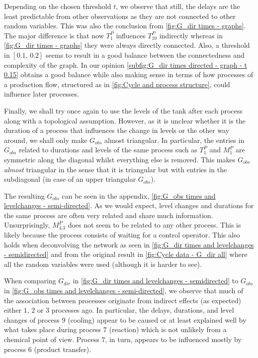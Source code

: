 \documentclass[../Thesis.tex]{subfiles}
\begin{document}
Depending on the chosen threshold $t$, we observe that still, the delays are the least predictable from other observations as they are not connected to other random variables. This was also the conclusion from \autoref{fig:G_dir times - graphs}. The major difference is that now $T^P_1$ influences $T^P_{10}$ indirectly whereas in \autoref{fig:G_dir times - graphs} they were always directly connected. Also, a threshold in $[0.1,\, 0.2]$ seems to result in a good balance between the connectedness and complexity of the graph. In our opinion \autoref{subfig:G_dir times directed - graph - t 0.15} obtains a good balance while also making sense in terms of how processes of a production flow, structured as in \autoref{fig:Cycle and process structure}, could influence later processes.





Finally, we shall try once again to use the levels of the tank after each process along with a topological assumption. However, as it is unclear whether it is the duration of a process that influences the change in levels or the other way around, we shall only make $G_{obs}$ almost triangular. In particular, the entries in $G_{obs}$ related to durations and levels of the same process such as $T^P_1$ and $M^P_1$ are symmetric along the diagonal whilst everything else is removed. This makes $G_{obs}$ \textit{almost} triangular in the sense that it is triangular but with entries in the subdiagonal (in case of an upper triangular $G_{obs}$).

The resulting $G_{obs}$ can be seen in the appendix, \autoref{fig:G_obs times and levelchanges - semi-directed}. As we would expect, level changes and durations for the same process are often very related and share much information. Unsurprisingly, $M^P_{4.3}$ does not seem to be related to any other process. This is likely because the process consists of waiting for a control operator. This also holds when deconvolving the network as seen in \autoref{fig:G_dir times and levelchanges - semidirected} and from the original result in \autoref{fig:Cycle data - G_dir all} where all the random variables were used (although it is harder to see).



When comparing $G_{dir}$ in \autoref{fig:G_dir times and levelchanges - semidirected} to $G_{obs}$ in \autoref{fig:G_obs times and levelchanges - semi-directed}, we observe that much of the association between processes originate from indirect effects (as expected) either $1$, $2$ or $3$ processes ago. In particular, the delays, durations, and level changes of process $9$ (cooling) appear to be caused or at least explained well by what takes place during process $7$ (reaction) which is not unlikely from a chemical point of view. Process $7$, in turn, appears to be influenced mostly by process $6$ (product transfer).
\end{document}
